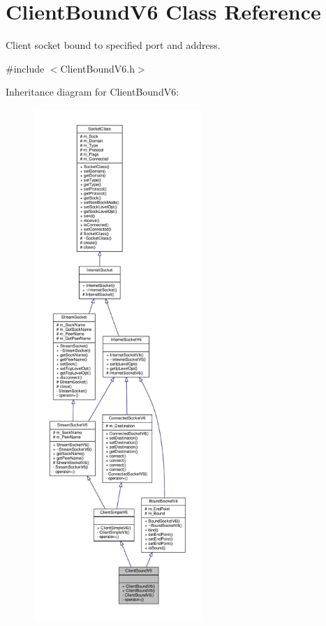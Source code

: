 \hypertarget{classClientBoundV6}{}\section{Client\+Bound\+V6 Class Reference}
\label{classClientBoundV6}


Client socket bound to specified port and address.  




{\ttfamily \#include $<$Client\+Bound\+V6.\+h$>$}



Inheritance diagram for Client\+Bound\+V6\+:\nopagebreak
\begin{figure}[H]
\begin{center}
\leavevmode
\includegraphics[height=550pt]{classClientBoundV6__inherit__graph}
\end{center}
\end{figure}
